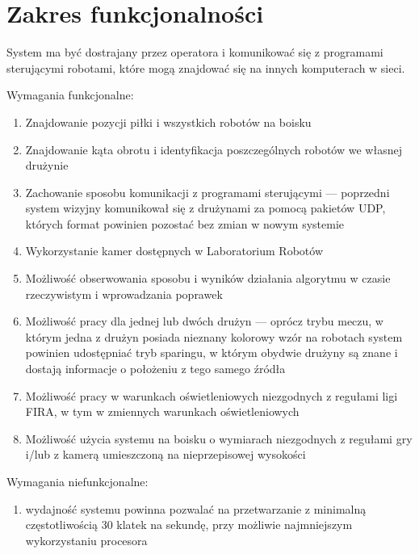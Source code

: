 \documentclass[polish,12pt]{aghthesis}
\begin{document}
\section{Zakres funkcjonalności}
\label{sec:zakres-funkcjonalnosci}
% 

System ma być dostrajany przez operatora i komunikować się z programami
sterującymi robotami, które mogą znajdować się na innych 
komputerach w sieci.

Wymagania funkcjonalne:
\begin{enumerate}
\item Znajdowanie pozycji piłki i wszystkich robotów na boisku
\item Znajdowanie kąta obrotu i identyfikacja poszczególnych robotów
we własnej drużynie
\item Zachowanie sposobu komunikacji z programami sterującymi --- poprzedni
system wizyjny komunikował się z drużynami za pomocą pakietów UDP, których
format powinien pozostać bez zmian w nowym systemie
\item Wykorzystanie kamer dostępnych w Laboratorium Robotów
\item Możliwość obserwowania sposobu i wyników działania algorytmu w czasie
rzeczywistym i wprowadzania poprawek
\item Możliwość pracy dla jednej lub dwóch drużyn --- oprócz trybu meczu, w
którym jedna z drużyn posiada nieznany kolorowy wzór na robotach system powinien
udostępniać tryb sparingu, w którym obydwie drużyny są znane i dostają 
informacje o położeniu z tego samego źródła
\item Możliwość pracy w warunkach oświetleniowych niezgodnych z regułami ligi
FIRA, w tym w zmiennych warunkach oświetleniowych
\item Możliwość użycia systemu na boisku o wymiarach niezgodnych z regułami gry
i/lub z kamerą umieszczoną na nieprzepisowej wysokości
\end{enumerate}

Wymagania niefunkcjonalne:
\begin{enumerate}
\item wydajność systemu powinna pozwalać na przetwarzanie z minimalną
częstotliwością 30 klatek na sekundę, przy możliwie najmniejszym wykorzystaniu
procesora
\end{enumerate}
\end{document}

